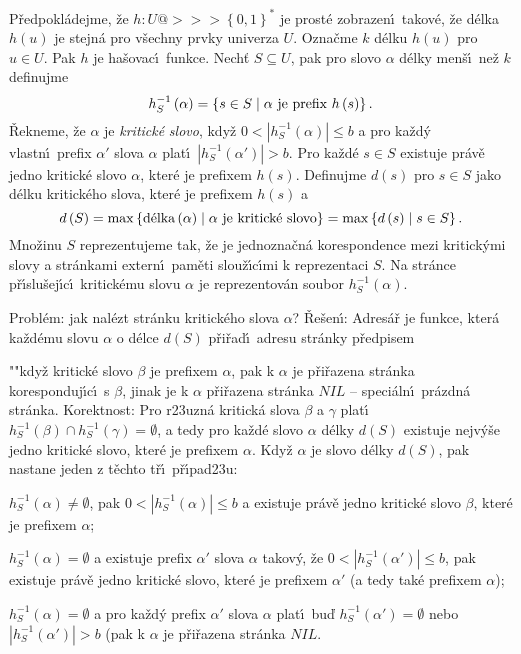\flushpar P\v redpokl\'adejme, \v ze $h:U@>>>\left\{0,1\right\}^{*}$ je prost\'e 
zobrazen\'\i\ takov\'e, \v ze d\'elka $h\left(u\right)$ je stejn\'a pro v\v sechny prvky 
univerza $U$.  Ozna\v cme $k$ d\'elku $h\left(u\right)$ pro $u\in U$.  Pak $
h$ je 
ha\v sovac\'\i\ funkce.  Nech\v t $S\subseteq U$, pak pro slovo $
\alpha$ d\'elky 
men\v s\'\i\ ne\v z $k$ definujme 
$$h^{-1}_S\left(\alpha \right)=\left\{s\in S\mid\alpha\text{\rm\ je prefix }h\left(s\right)\right\}.$$ 
\v Rekneme, \v ze $\alpha$ je \emph{kritick\'e} \emph{slovo}, kdy\v z 
$0<|h^{-1}_S\left(\alpha \right)|\le b$ a pro ka\v zd\'y vlastn\'\i\ prefix $
\alpha'$ slova $\alpha$ plat\'\i\ 
$|h^{-1}_S\left(\alpha'\right)|>b$.  Pro ka\v zd\'e $s\in S$ existuje pr\'av\v e jedno 
kritick\'e slovo $\alpha$, kter\'e je prefixem $h\left(s\right)$.  Definujme $
d\left(s\right)$ 
pro $s\in S$ jako d\'elku kritick\'eho slova, kter\'e je prefixem 
$h\left(s\right)$ a 
$$d\left(S\right)=\max\left\{\text{\rm d\'elka}\left(\alpha \right)\mid\alpha\text{\rm\ je kritick\'e slovo}\right\}=\max\left\{d\left(s\right)\mid s\in S\right\}.$$
Mno\v zinu $S$ reprezentujeme tak, \v ze je jednozna\v cn\'a 
korespondence mezi kritick\'ymi slovy a str\'ankami extern\'\i\ 
pam\v eti slou\v z\'\i\-c\'\i\-mi k reprezentaci $S$.  Na str\'ance 
p\v r\'\i slu\v sej\'\i c\'\i\ kritick\'emu slovu $\alpha$ je reprezentov\'an soubor 
$h^{-1}_S\left(\alpha \right)$.  

\flushpar Probl\'em: jak nal\'ezt str\'anku kritick\'eho slova 
$\alpha$?\newline 
\v Re\v sen\'\i : Adres\'a\v r je funkce, kter\'a ka\v zd\'emu slovu $
\alpha$ o 
d\'elce $d\left(S\right)$ p\v ri\v rad\'\i\ adresu str\'anky p\v redpisem
\roster
\item"{}"kdy\v z kritick\'e slovo $\beta$ je prefixem $\alpha$, pak k $
\alpha$ je 
p\v ri\v razena str\'an\-ka koresponduj\'\i c\'\i\ s $\beta$, jinak je k $
\alpha$ 
p\v ri\v razena str\'an\-ka $NIL$ -- speci\'aln\'\i\ pr\'azdn\'a str\'anka.
\endroster
\flushpar Korektnost: Pro r\accent23uzn\'a kritick\'a slova 
$\beta$ a $\gamma$ plat\'\i\ $h^{-1}_S\left(\beta \right)\cap h^{-1}_S\left(\gamma 
\right)=\emptyset$, a tedy pro ka\v zd\'e slovo $\alpha$ 
d\'elky $d\left(S\right)$ existuje nejv\'y\v se jedno kritick\'e slovo, kter\'e 
je prefixem $\alpha$. Kdy\v z $\alpha$ je slovo d\'elky $d\left(S\right)$, pak nastane 
jeden z t\v echto t\v r\'\i\ p\v r\'\i pad\accent23u:
\roster
\item
$h^{-1}_S\left(\alpha \right)\ne\emptyset$, pak $0<|h^{-1}_S\left(\alpha \right)|\le b$ a existuje pr\'av\v e jedno kritick\'e slovo $
\beta$, 
kter\'e je prefixem $\alpha$; 
\item
$h^{-1}_S\left(\alpha \right)=\emptyset$ a existuje prefix $\alpha'$ slova $
\alpha$ takov\'y, \v ze 
$0<|h^{-1}_S\left(\alpha'\right)|\le b$, pak existuje pr\'av\v e jedno kritick\'e slovo, kter\'e je 
prefixem $\alpha'$ (a tedy tak\'e prefixem $\alpha$);
\item
$h^{-1}_S\left(\alpha \right)=\emptyset$ a pro ka\v zd\'y prefix $\alpha'$ slova $
\alpha$ plat\'\i\ bu\v d 
$h^{-1}_S\left(\alpha'\right)=\emptyset$ nebo $|h^{-1}_S\left(\alpha'\right)|>b$ (pak k $
\alpha$ je p\v ri\v razena 
str\'anka $NIL$.
\endroster

